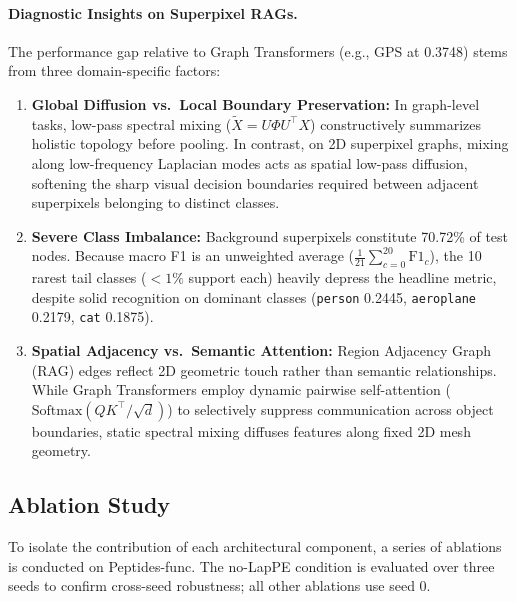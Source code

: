 \documentclass[10pt]{article}
\begin{document}
\paragraph{Diagnostic Insights on Superpixel RAGs.}
The performance gap relative to Graph Transformers (e.g., GPS at 0.3748) stems from three domain-specific factors:
\begin{enumerate}[leftmargin=2em]
    \item \textbf{Global Diffusion vs.\ Local Boundary Preservation:} In graph-level tasks, low-pass spectral mixing ($\tilde{X} = U \Phi U^\top X$) constructively summarizes holistic topology before pooling. In contrast, on 2D superpixel graphs, mixing along low-frequency Laplacian modes acts as spatial low-pass diffusion, softening the sharp visual decision boundaries required between adjacent superpixels belonging to distinct classes.
    \item \textbf{Severe Class Imbalance:} Background superpixels constitute 70.72\% of test nodes. Because macro F1 is an unweighted average ($\frac{1}{21}\sum_{c=0}^{20}\text{F1}_c$), the 10 rarest tail classes ($<1\%$ support each) heavily depress the headline metric, despite solid recognition on dominant classes (\texttt{person} 0.2445, \texttt{aeroplane} 0.2179, \texttt{cat} 0.1875).
    \item \textbf{Spatial Adjacency vs.\ Semantic Attention:} Region Adjacency Graph (RAG) edges reflect 2D geometric touch rather than semantic relationships. While Graph Transformers employ dynamic pairwise self-attention ($\text{Softmax}(QK^\top/\sqrt{d})$) to selectively suppress communication across object boundaries, static spectral mixing diffuses features along fixed 2D mesh geometry.
\end{enumerate}

\subsection{Ablation Study}
\label{sec:ablation}

To isolate the contribution of each architectural component, a series of ablations is conducted on Peptides-func. The no-LapPE condition is evaluated over three seeds to confirm cross-seed robustness; all other ablations use seed 0.
\end{document}
